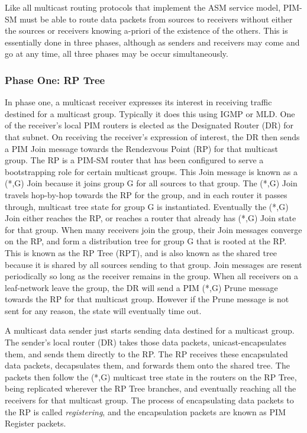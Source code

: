 Like all multicast routing protocols that implement the ASM service model,
PIM-SM must be able to route data packets from sources to receivers
without either the sources or receivers knowing a-priori of the
existence of the others.  This is essentially done in three phases,
although as senders and receivers may come and go at any time, all
three phases may be occur simultaneously.

\subsubsection*{Phase One: RP Tree}

In phase one, a multicast receiver expresses its interest in receiving
traffic destined for a multicast group.  Typically it does this using
IGMP or MLD.  One of the receiver's local PIM routers is elected as the
Designated Router (DR) for that subnet.  On receiving the receiver's
expression of interest, the DR then sends a PIM Join message towards
the Rendezvous Point (RP) for that multicast group.  The RP is a
PIM-SM router that has been configured to serve a bootstrapping role
for certain multicast groups.  This Join message is known as a (*,G)
Join because it joins group G for all sources to that group.  The
(*,G) Join travels hop-by-hop towards the RP for the group, and in
each router it passes through, multicast tree state for group G is
instantiated.  Eventually the (*,G) Join either reaches the RP, or
reaches a router that already has (*,G) Join state for that group.
When many receivers join the group, their Join messages converge on
the RP, and form a distribution tree for group G that is rooted at the
RP.  This is known as the RP Tree (RPT), and is also known as the
shared tree because it is shared by all sources sending to that group.
Join messages are resent periodically so long as the receiver remains
in the group.  When all receivers on a leaf-network leave the group,
the DR will send a PIM (*,G) Prune message towards the RP for that
multicast group. However if the Prune message is not sent for any
reason, the state will eventually time out.

A multicast data sender just starts sending data destined for a
multicast group.  The sender's local router (DR) takes those data
packets, unicast-encapsulates them, and sends them directly to the RP.
The RP receives these encapsulated data packets, decapsulates them,
and forwards them onto the shared tree.  The packets then follow the
(*,G) multicast tree state in the routers on the RP Tree, being
replicated wherever the RP Tree branches, and eventually reaching all
the receivers for that multicast group.  The process of encapsulating
data packets to the RP is called {\it registering}, and the encapsulation
packets are known as PIM Register packets.  

